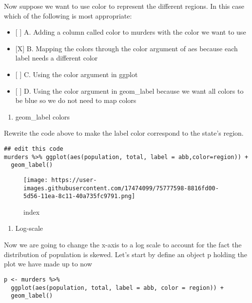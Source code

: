 \documentclass[]{article}
\providecommand{\tightlist}{%
  \setlength{\itemsep}{0pt}\setlength{\parskip}{0pt}}
\begin{document}
Now suppose we want to use color to represent the different regions. In
this case which of the following is most appropriate:

\begin{itemize}
\tightlist
\item
  {[} {]} A. Adding a column called color to murders with the color we
  want to use
\item
  {[}X{]} B. Mapping the colors through the color argument of aes
  because each label needs a different color
\item
  {[} {]} C. Using the color argument in ggplot
\item
  {[} {]} D. Using the color argument in geom\_label because we want all
  colors to be blue so we do not need to map colors
\end{itemize}

\begin{enumerate}
\def\labelenumi{\arabic{enumi}.}
\setcounter{enumi}{11}
\tightlist
\item
  geom\_label colors
\end{enumerate}

Rewrite the code above to make the label color correspond to the state's
region.

\begin{verbatim}
## edit this code
murders %>% ggplot(aes(population, total, label = abb,color=region)) +
  geom_label()
\end{verbatim}

\begin{figure}
\centering
\texttt{[image: https://user-images.githubusercontent.com/17474099/75777598-8816fd00-5d56-11ea-8c11-40a735fc9791.png]}
\caption{index}
\end{figure}

\begin{enumerate}
\def\labelenumi{\arabic{enumi}.}
\setcounter{enumi}{12}
\tightlist
\item
  Log-scale
\end{enumerate}

Now we are going to change the x-axis to a log scale to account for the
fact the distribution of population is skewed. Let's start by define an
object p holding the plot we have made up to now

\begin{verbatim}
p <- murders %>% 
  ggplot(aes(population, total, label = abb, color = region)) +
  geom_label() 
\end{verbatim}
\end{document}
